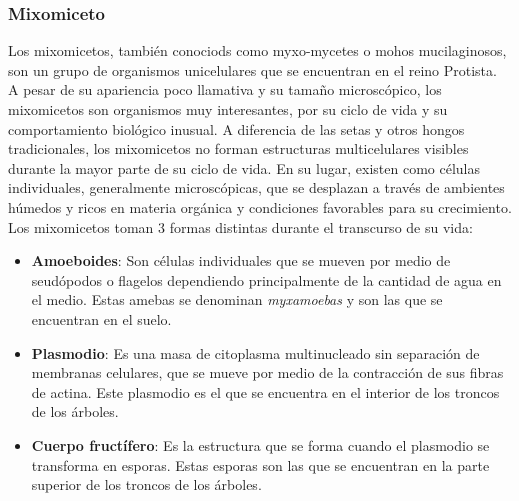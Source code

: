 \subsubsection{Mixomiceto}
    Los mixomicetos, tambi\'en conociods como myxo-mycetes o mohos mucilaginosos, son 
        un grupo de organismos unicelulares que se encuentran en el reino Protista.
        A pesar de su apariencia poco llamativa y su tama\~no microsc\'opico,
        los mixomicetos son organismos muy interesantes, por su ciclo de vida y su comportamiento
        biol\'ogico inusual.
    \vskip 0.5cm
    A diferencia de las setas y otros hongos tradicionales, los mixomicetos no forman estructuras 
        multicelulares visibles durante la mayor parte de su ciclo de vida. En su lugar, 
        existen como c\'elulas individuales, generalmente microsc\'opicas, que se desplazan 
        a trav\'es de ambientes h\'umedos y ricos en materia org\'anica y condiciones 
        favorables para su crecimiento.
    \vskip 0.5cm
    Los mixomicetos toman 3 formas distintas durante el transcurso de su vida: 
    \begin{itemize}
        \item \textbf{Amoeboides}: Son c\'elulas individuales que se mueven por medio de 
            seud\'opodos o flagelos dependiendo principalmente de la cantidad de agua en el medio.
            Estas amebas se denominan \textit{myxamoebas} y son las que se encuentran en el suelo.
        \item \textbf{Plasmodio}: Es una masa de citoplasma multinucleado sin separaci\'on de 
            membranas celulares, que se mueve por medio de la contracci\'on de sus fibras de actina.
            Este plasmodio es el que se encuentra en el interior de los troncos de los \'arboles.
        \item \textbf{Cuerpo fruct\'ifero}: Es la estructura que se forma cuando el plasmodio 
            se transforma en esporas. Estas esporas son las que se encuentran en la parte superior 
            de los troncos de los \'arboles.
    \end{itemize}
    \vskip 0.5cm
